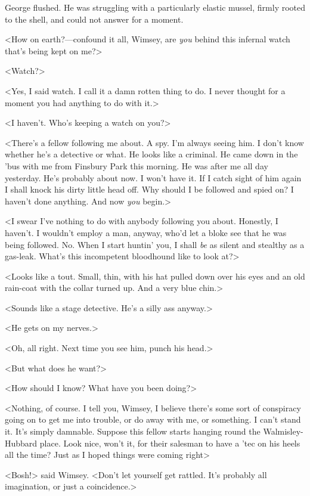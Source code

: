George flushed. He was struggling with a particularly elastic mussel, firmly rooted to the shell, and could not answer for a moment.

<How on earth?—confound it all, Wimsey, are \emph{you} behind this infernal watch that's being kept on me?>

<Watch?>

<Yes, I said watch. I call it a damn rotten thing to do. I never thought for a moment you had anything to do with it.>

<I haven't. Who's keeping a watch on you?>

<There's a fellow following me about. A spy. I'm always seeing him. I don't know whether he's a detective or what. He looks like a criminal. He came down in the 'bus with me from Finsbury Park this morning. He was after me all day yesterday. He's probably about now. I won't have it. If I catch sight of him again I shall knock his dirty little head off. Why should I be followed and spied on? I haven't done anything. And now \emph{you} begin.>

<I swear I've nothing to do with anybody following you about. Honestly, I haven't. I wouldn't employ a man, anyway, who'd let a bloke see that he was being followed. No. When I start huntin' you, I shall \emph{be} as silent and stealthy as a gas-leak. What's this incompetent bloodhound like to look at?>

<Looks like a tout. Small, thin, with his hat pulled down over his eyes and an old rain-coat with the collar turned up. And a very blue chin.>

<Sounds like a stage detective. He's a silly ass anyway.>

<He gets on my nerves.>

<Oh, all right. Next time you see him, punch his head.>

<But what does he want?>

<How should I know? What have you been doing?>

<Nothing, of course. I tell you, Wimsey, I believe there's some sort of conspiracy going on to get me into trouble, or do away with me, or something. I can't stand it. It's simply damnable. Suppose this fellow starts hanging round the Walmisley-Hubbard place. Look nice, won't it, for their salesman to have a 'tec on his heels all the time? Just as I hoped things were coming right\longdash>

<Bosh!> said Wimsey. <Don't let yourself get rattled. It's probably all imagination, or just a coincidence.>


